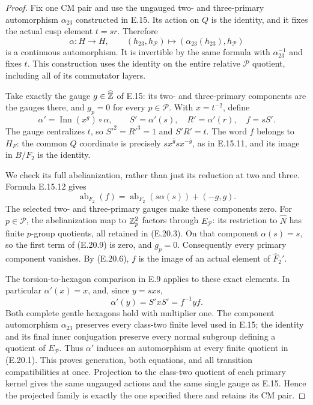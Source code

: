 \begin{proof}
Fix one CM pair and use the ungauged two- and
three-primary automorphism $\alpha_{23}$ constructed
in E.15. Its action on $Q$ is the identity, and it
fixes the actual cusp element $t=sr$. Therefore
\[
 \alpha:H\longrightarrow H,
 \qquad (h_{23},h_{\mathscr P})\longmapsto
          (\alpha_{23}(h_{23}),h_{\mathscr P})
 \tag{E.20.7}
\]
is a continuous automorphism. It is invertible by the
same formula with $\alpha_{23}^{-1}$ and fixes $t$.
This construction uses the identity on the entire
relative $\mathscr P$ quotient, including all of its
commutator layers.

Take exactly the gauge $g\in\widehat{\mathbb Z}$ of E.15:
its two- and three-primary components are the gauges
there, and $g_p=0$ for every $p\in\mathscr P$.
With $x=t^{-2}$, define
\[
 \alpha'=\operatorname{Inn}(x^g)\circ\alpha,
 \qquad S'=\alpha'(s),\quad R'=\alpha'(r),\quad f=sS'.
 \tag{E.20.8}
\]
The gauge centralizes $t$, so
$S'^2=R'^3=1$ and $S'R'=t$. The word $f$ belongs
to $H_F$: the common $Q$ coordinate is precisely
$s x^{\bar g}s x^{-\bar g}$, as in E.15.11,
and its image in $B/F_2$ is the identity.

We check its full abelianization, rather than just
its reduction at two and three. Formula E.15.12 gives
\[
 \operatorname{ab}_{F_2}(f)
   =\operatorname{ab}_{F_2}(s\alpha(s))+(-g,g).
 \tag{E.20.9}
\]
The selected two- and three-primary gauges make
these components zero. For $p\in\mathscr P$, the
abelianization map to $\mathbb Z_p^2$ factors through
$E_{\mathscr P}$: its restriction to $\widehat N$
has finite $p$-group quotients, all retained in
(E.20.3). On that component $\alpha(s)=s$, so the
first term of (E.20.9) is zero, and $g_p=0$.
Consequently every primary component vanishes.
By (E.20.6), $f$ is the image of an actual element
of $\widehat F_2'$.

The torsion-to-hexagon comparison in E.9 applies to
these exact elements. In particular $\alpha'(x)=x$,
and, since $y=sxs$,
\[
             \alpha'(y)=S'xS'=f^{-1}yf.
 \tag{E.20.10}
\]
Both complete gentle hexagons hold with multiplier
one. The component automorphism $\alpha_{23}$
preserves every class-two finite level used in E.15;
the identity and its final inner conjugation preserve
every normal subgroup defining a quotient of
$E_{\mathscr P}$. Thus $\alpha'$ induces an
automorphism at every finite quotient in (E.20.1).
This proves generation, both equations, and all
transition compatibilities at once. Projection to
the class-two quotient of each primary kernel gives
the same ungauged actions and the same single gauge
as E.15. Hence the projected family is exactly the
one specified there and retains its CM pair.


\end{proof}
